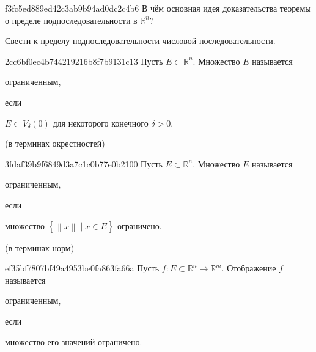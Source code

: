 \begin{note}{f3fc5ed889ed42c3ab9b94ad0dc2c4b6}
    В чём основная идея доказательства теоремы о пределе подпоследовательности в \({ \mathbb R^{n} }\)?

    \begin{cloze}{1}
        Свести к пределу подпоследовательности числовой последовательности.
    \end{cloze}
\end{note}

\begin{note}{2cc6bf0ec4b744219216b8f7b9131c13}
    Пусть \({ E \subset \mathbb R^{n} }\).
    Множество \({ E }\) называется \begin{icloze}{2}ограниченным,\end{icloze} если \begin{icloze}{1}\({ E \subset V_{\delta}(0) }\) для некоторого конечного \({ \delta > 0 }\).\end{icloze}

    \begin{center}
        \tiny
        (в терминах окрестностей)
    \end{center}
\end{note}

\begin{note}{3fdaf39b9f6849d3a7c1c0b77e0b2100}
    Пусть \({ E \subset \mathbb R^{n} }\).
    Множество \({ E }\) называется \begin{icloze}{2}ограниченным,\end{icloze} если \begin{icloze}{1}множество \({ \left\{ \left\lVert x \right\rVert \mid x \in E \right\} }\) ограничено.\end{icloze}

    \begin{center}
        \tiny
        (в терминах норм)
    \end{center}
\end{note}

\begin{note}{ef35bf7807bf49a4953be0fa863fa66a}
    Пусть \({ f : E \subset \mathbb R^{n} \to \mathbb R^{m} }\). Отображение \({ f }\) называется \begin{icloze}{2}ограниченным,\end{icloze} если \begin{icloze}{1}множество его значений ограничено.\end{icloze}
\end{note}

